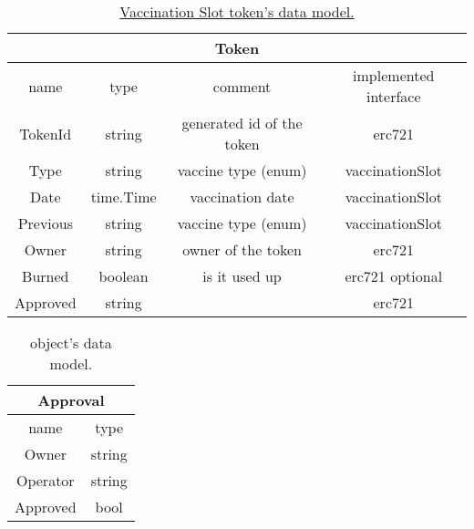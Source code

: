 \begin{center}
  \begin{table}[!ht]
    \centering
    \begin{tabular}{|c | c | c | c |}
      \hline
      \multicolumn{4}{|c|}{Token}                                              \\
      \hline
      name     & type      & comment                   & implemented interface \\
      \hline
      TokenId  & string    & generated id of the token & erc721                \\
      Type     & string    & vaccine type (enum)       & vaccinationSlot       \\
      Date     & time.Time & vaccination date          & vaccinationSlot       \\
      Previous & string    & vaccine type (enum)       & vaccinationSlot       \\
      Owner    & string    & owner of the token        & erc721                \\
      Burned   & boolean   & is it used up             & erc721 optional       \\
      Approved & string    &                           & erc721                \\
      \hline
    \end{tabular}
    \caption{\href{https://pkg.go.dev/github.com/perryd01/vaccination-slot/chaincode\#VaccinationSlot}{Vaccination Slot token's data model.}}
  \end{table}
\end{center}


\begin{center}
  \begin{table}[!ht]
    \centering
    \begin{tabular}{| c | c |}
      \hline
      \multicolumn{2}{|c|}{Approval} \\
      \hline
      name     & type                \\
      \hline
      Owner    & string              \\
      Operator & string              \\
      Approved & bool                \\
      \hline
    \end{tabular}
    \caption{ object's data model.}
  \end{table}
\end{center}


